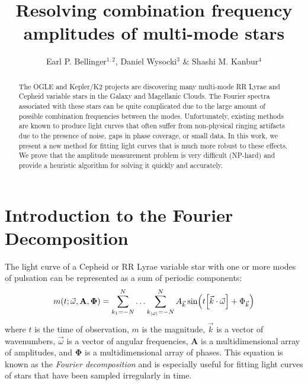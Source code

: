 \documentclass[11pt,twoside]{book}
\begin{document}
\pagestyle{myheadings}
\setcounter{equation}{0}\setcounter{figure}{0}\setcounter{footnote}{0}\setcounter{section}{0}\setcounter{table}{0}\setcounter{page}{1}
\title{Resolving combination frequency amplitudes of multi-mode stars}
\author{Earl P. Bellinger$^{1,2}$, Daniel Wysocki$^3$ \& Shashi M. Kanbur$^4$}

\begin{abstract}
The OGLE and Kepler/K2 projects are discovering many multi-mode RR Lyrae and Cepheid variable stars in the Galaxy and Magellanic Clouds. The Fourier spectra associated with these stars can be quite complicated due to the large amount of possible combination frequencies between the modes. Unfortunately, existing methods are known to produce light curves that often suffer from non-physical ringing artifacts due to the presence of noise, gaps in phase coverage, or small data. In this work, we present a new method for fitting light curves that is much more robust to these effects. We prove that the amplitude measurement problem is very difficult (NP-hard) and provide a heuristic algorithm for solving it quickly and accurately. 
\end{abstract}

\section{Introduction to the Fourier Decomposition}
The light curve of a Cepheid or RR Lyrae variable star with one or more modes of pulsation can be represented as a sum of periodic components:
\begin{equation}
    m(t ; \vec \omega, \mathbf A, \boldsymbol \Phi) = \sum_{k_1={-N}}^N \ldots \sum_{k_{|\vec \omega|}={-N}}^N A_{\vec k} \sin(t\qty[\vec k\cdot \vec \omega] + \Phi_{\vec k})
\end{equation}
where $t$ is the time of observation, $m$ is the magnitude, $\vec k$ is a vector of wavenumbers, $\vec \omega$ is a vector of angular frequencies, $\mathbf A$ is a multidimensional array of amplitudes, and $\boldsymbol \Phi$ is a multidimensional array of phases. This equation is known as the \emph{Fourier decomposition} and is especially useful for fitting light curves of stars that have been sampled irregularly in time. 
\end{document}
